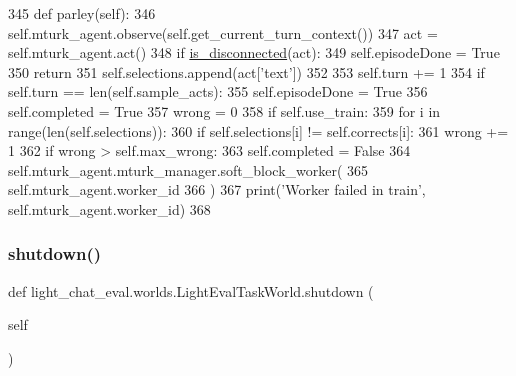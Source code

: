 \begin{DoxyCode}
345     \textcolor{keyword}{def }parley(self):
346         self.mturk\_agent.observe(self.get\_current\_turn\_context())
347         act = self.mturk\_agent.act()
348         \textcolor{keywordflow}{if} \hyperlink{namespacelight__chats_1_1worlds_a43b0aff73307cda95a089763b77f40d3}{is\_disconnected}(act):
349             self.episodeDone = \textcolor{keyword}{True}
350             \textcolor{keywordflow}{return}
351         self.selections.append(act[\textcolor{stringliteral}{'text'}])
352 
353         self.turn += 1
354         \textcolor{keywordflow}{if} self.turn == len(self.sample\_acts):
355             self.episodeDone = \textcolor{keyword}{True}
356             self.completed = \textcolor{keyword}{True}
357             wrong = 0
358             \textcolor{keywordflow}{if} self.use\_train:
359                 \textcolor{keywordflow}{for} i \textcolor{keywordflow}{in} range(len(self.selections)):
360                     \textcolor{keywordflow}{if} self.selections[i] != self.corrects[i]:
361                         wrong += 1
362             \textcolor{keywordflow}{if} wrong > self.max\_wrong:
363                 self.completed = \textcolor{keyword}{False}
364                 self.mturk\_agent.mturk\_manager.soft\_block\_worker(
365                     self.mturk\_agent.worker\_id
366                 )
367                 print(\textcolor{stringliteral}{'Worker failed in train'}, self.mturk\_agent.worker\_id)
368 
\end{DoxyCode}
\mbox{\label{classlight__chat__eval_1_1worlds_1_1LightEvalTaskWorld_a86acc8c22dd59f854c4a43f34d804975}} 
\subsubsection{\texorpdfstring{shutdown()}{shutdown()}}
{\footnotesize\ttfamily def light\+\_\+chat\+\_\+eval.\+worlds.\+Light\+Eval\+Task\+World.\+shutdown (\begin{DoxyParamCaption}\item[{}]{self }\end{DoxyParamCaption})}



